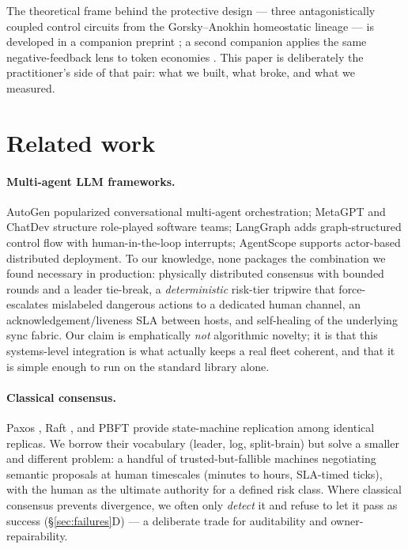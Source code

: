 \documentclass[11pt]{article}
\begin{document}
The theoretical frame behind the protective design --- three antagonistically coupled control circuits from the Gorsky--Anokhin homeostatic lineage --- is developed in a companion preprint \cite{homeostatic}; a second companion applies the same negative-feedback lens to token economies \cite{lechatelier}. This paper is deliberately the practitioner's side of that pair: what we built, what broke, and what we measured.

\section{Related work}\label{sec:related}
\paragraph{Multi-agent LLM frameworks.} AutoGen \cite{autogen} popularized conversational multi-agent orchestration; MetaGPT \cite{metagpt} and ChatDev \cite{chatdev} structure role-played software teams; LangGraph adds graph-structured control flow with human-in-the-loop interrupts; AgentScope \cite{agentscope} supports actor-based distributed deployment. To our knowledge, none packages the combination we found necessary in production: physically distributed consensus with bounded rounds and a leader tie-break, a \emph{deterministic} risk-tier tripwire that force-escalates mislabeled dangerous actions to a dedicated human channel, an acknowledgement/liveness SLA between hosts, and self-healing of the underlying sync fabric. Our claim is emphatically \emph{not} algorithmic novelty; it is that this systems-level integration is what actually keeps a real fleet coherent, and that it is simple enough to run on the standard library alone.

\paragraph{Classical consensus.} Paxos \cite{paxos}, Raft \cite{raft}, and PBFT \cite{pbft} provide state-machine replication among identical replicas. We borrow their vocabulary (leader, log, split-brain) but solve a smaller and different problem: a handful of trusted-but-fallible machines negotiating semantic proposals at human timescales (minutes to hours, SLA-timed ticks), with the human as the ultimate authority for a defined risk class. Where classical consensus prevents divergence, we often only \emph{detect} it and refuse to let it pass as success (\S\ref{sec:failures}D) --- a deliberate trade for auditability and owner-repairability.
\end{document}
